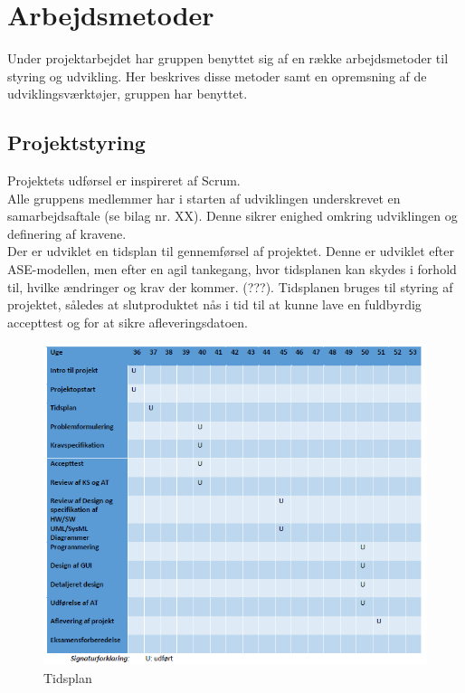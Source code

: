 \chapter{Arbejdsmetoder}\label{kapitel_Arbejdsmetoder}
Under projektarbejdet har gruppen benyttet sig af en række arbejdsmetoder til styring og udvikling.
Her beskrives disse metoder samt en opremsning af de udviklingsværktøjer, gruppen har benyttet.

\section{Projektstyring}
Projektets udførsel er inspireret af Scrum.\\
\newline
Alle gruppens medlemmer har i starten af udviklingen underskrevet en samarbejdsaftale (se bilag nr. XX). Denne sikrer enighed omkring udviklingen og definering af kravene. \\
\newline
Der er udviklet en tidsplan til gennemførsel af projektet. Denne er udviklet efter ASE-modellen, men efter en agil tankegang, hvor tidsplanen kan skydes i forhold til, hvilke ændringer og krav der kommer. (???). Tidsplanen bruges til styring af projektet, således at slutproduktet nås i tid til at kunne lave en fuldbyrdig accepttest og for at sikre afleveringsdatoen. 

\begin{figure}[H]
\centering
\includegraphics[scale=0.70]{tidsplan.PNG}
\caption{Tidsplan}
\end{figure}

